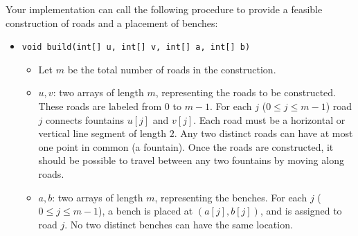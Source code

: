 Your implementation can call the following procedure to provide a feasible construction of roads and a
placement of benches:

\begin{itemize}

\item \texttt{void build(int[] u, int[] v, int[] a, int[] b)}
\begin{itemize}

\item Let $m$ be the total number of roads in the construction.
\item $u,v$: two arrays of length $m$, representing the roads to be constructed. These roads are labeled from $0$ to $m-1$. For each $j$ ($0 \leq j \leq m-1$) road $j$ connects fountains $u[j]$ and $v[j]$. Each road must be a horizontal or vertical line segment of length $2$. Any two distinct roads can have at most one point in common (a fountain). Once the roads are constructed, it should be possible to travel between any two fountains by moving along roads.
\item $a,b$: two arrays of length $m$, representing the benches. For each $j$ ($0 \leq j \leq m-1$), a
bench is placed at $(a[j],b[j])$, and is assigned to road $j$. No two distinct benches can have
the same location.
\end{itemize}
\end{itemize}